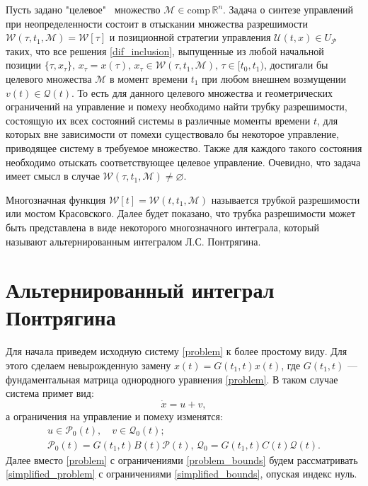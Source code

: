 Пусть задано "целевое" \ множество \( \mathcal{M} \in \text{comp} \,
 \mathbb{R}^n \). Задача о синтезе управлений при неопределенности состоит 
 в отыскании множества разрешимости \( \mathcal{W}(\tau, t_1, \mathcal{M}) = 
 \mathcal{W}[\tau] \) и позиционной стратегии управления
 \( \mathcal{U}(t,x) \in U_{\mathcal{P}} \) таких, что все решения
 \eqref{dif_inclusion}, выпущенные из любой начальной позиции \( \{\tau, 
 x_{\tau}\}, \, x_{\tau} = x(\tau), \, x_{\tau} \in \mathcal{W}(\tau, t_1, 
 \mathcal{M}), \, \tau \in [t_0, t_1) \), достигали бы целевого множества
 \( \mathcal{M} \) в момент времени \( t_1 \) при любом внешнем возмущении
 \( v(t) \in \mathcal{Q}(t) \). То есть для данного целевого множества и 
 геометрических ограничений на управление и помеху необходимо найти трубку
 разрешимости, состоящую их всех состояний системы в различные моменты времени
 \( t \), для которых вне зависимости от помехи существовало бы некоторое
 управление, приводящее систему в требуемое множество. Также 
 для каждого такого состояния необходимо отыскать соответствующее целевое 
 управление. Очевидно, что задача имеет смысл в случае
 \( \mathcal{W}(\tau, t_1, \mathcal{M}) \ne \varnothing \).
 
Многозначная функция \( \mathcal{W}[t] = \mathcal{W}(t, t_1,\mathcal{M}) \) 
 называется трубкой разрешимости или мостом Красовского. Далее будет показано,
 что трубка разрешимости может быть представлена в виде некоторого многозначного
 интеграла, который называют альтернированным интегралом Л.С. Понтрягина.

\section{Альтернированный интеграл Понтрягина}
Для начала приведем исходную систему \eqref{problem} к более простому виду.
 Для этого сделаем невырожденную замену \( x(t) = G(t_1, t)x(t) \), где 
 \( G(t_1,t) \) --- фундаментальная матрица однородного уравнения 
 \eqref{problem}. В таком случае система примет вид:
\begin{equation}\label{simplified_problem}
    \dot{x} = u + v,
\end{equation}
 а ограничения на управление и помеху изменятся:
\begin{equation}\label{simplified_bounds}
 \begin{gathered}
    u \in \mathcal{P}_0(t), \quad v \in \mathcal{Q}_0(t); \\
    \mathcal{P}_0(t) = G(t_1, t) B(t) \mathcal{P}(t), \, \mathcal{Q}_0 = 
     G(t_1,t)C(t)\mathcal{Q}(t).
 \end{gathered}
\end{equation}
Далее вместо \eqref{problem} с ограничениями \eqref{problem_bounds} будем 
 рассматривать \eqref{simplified_problem} с ограничениями \eqref{simplified_bounds},
 опуская индекс нуль.

